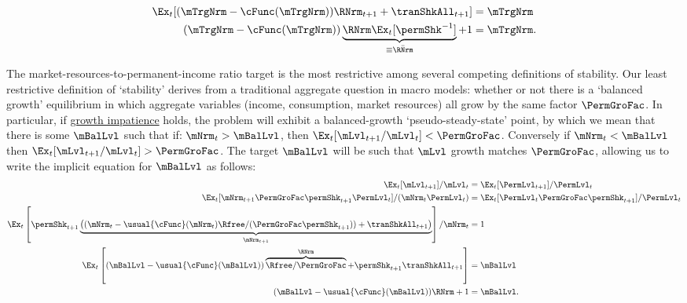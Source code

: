 \documentclass[BufferStockTheory]{subfiles}
\begin{document}
\begin{equation} \label{eq:mTargImplicit}
  \begin{split}
    \Ex_{t} [(\mTrgNrm-\cFunc(\mTrgNrm))\RNrm_{t+1}+\tranShkAll_{t+1}] & = \mTrgNrm     \\   (\mTrgNrm-\cFunc(\mTrgNrm))\underbrace{\RNrm\Ex_{t}[\permShk^{-1}]}_{\equiv \bar{\RNrm}}+1 & = \mTrgNrm .
  \end{split}
\end{equation}

\hypertarget{Collective-Stability}{}
\hypertarget{pseudo-steady-state}{}

The market-resources-to-permanent-income ratio target is the most restrictive among several competing definitions of stability. Our least restrictive definition of `stability' derives from a traditional aggregate question in macro models: whether or not there is a `balanced growth' equilibrium in which aggregate variables (income, consumption, market resources) all grow by the same factor $\PermGroFac$. In particular, if \hyperlink{GICRaw}{growth impatience} holds, the problem will exhibit a balanced-growth `pseudo-steady-state' point, by which we mean that there is some ${\mBalLvl}$ such that if:
\hypertarget{balgrostable}{}
\hypertarget{balgrostableSolve}{}
$\mNrm_{t}>{\mBalLvl}$, then $\Ex_{t}[\mLvl_{t+1}/\mLvl_{t}] < \PermGroFac$. Conversely if $\mNrm_{t}<{\mBalLvl}$ then $\Ex_{t}[\mLvl_{t+1}/\mLvl_{t}] > \PermGroFac$. The target $\mBalLvl$ will be such that $\mLvl$ growth matches $\PermGroFac$, allowing us to write the implicit equation for $\mBalLvl$ as follows:
%
%
\begin{equation}\label{eq:balgrostable}
  \begin{split}
    \Ex_{t}[\mLvl_{t+1}]/\mLvl_{t} & =\Ex_{t}[\PermLvl_{t+1}]/\PermLvl_{t}
    \\  \Ex_{t}[\mNrm_{t+1}\PermGroFac\permShk_{t+1}\PermLvl_{t}]/(\mNrm_{t}\PermLvl_{t}) & =\Ex_{t}[\PermLvl_{t}\PermGroFac\permShk_{t+1}]/\PermLvl_{t}
    \\ \Ex_{t}\left[\permShk_{t+1}\underbrace{\left((\mNrm_{t}-\usual{\cFunc}(\mNrm_{t})\Rfree/(\PermGroFac\permShk_{t+1}))+\tranShkAll_{t+1}\right)}_{\mNrm_{t+1}}\right]/\mNrm_{t} & = 1
    \\ 
    \Ex_{t}\left[(\mBalLvl-\usual{\cFunc}(\mBalLvl))\overbrace{\Rfree/\PermGroFac}^{\RNrm}+\permShk_{t+1}\tranShkAll_{t+1}\right] & = \mBalLvl
    \\  (\mBalLvl-\usual{\cFunc}(\mBalLvl))\RNrm+ 1 & = \mBalLvl .
  \end{split}
\end{equation}
\end{document}
